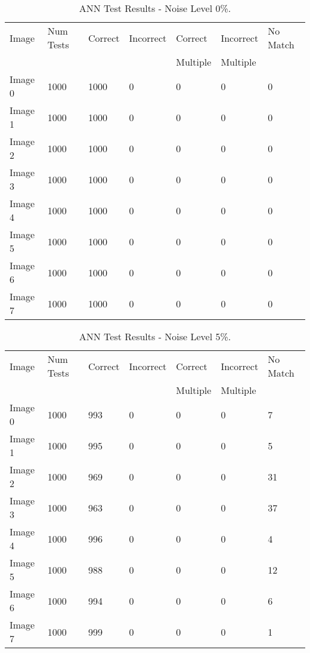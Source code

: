 
\begin{table}[tbh]
\caption{ANN Test Results - Noise Level 0\%. \label{table:ann0}}
\begin{center}
\begin{tabular}{|l|l|l|l|l|l|l|}
  \hline
  Image & Num Tests & Correct & Incorrect & Correct & Incorrect & No Match \\
  &&&&Multiple&Multiple&\\
 \hline
  Image 0 & 1000 & 1000 & 0 & 0 & 0 & 0\\
\hline
  Image 1 & 1000 & 1000 & 0 & 0 & 0 & 0 \\ 
\hline
  Image 2 & 1000 & 1000 & 0 & 0 & 0 & 0 \\
\hline
  Image 3 & 1000 & 1000 & 0 & 0 & 0 & 0\\
\hline
  Image 4 &1000 & 1000 & 0 & 0 & 0 & 0 \\
\hline
  Image 5 &1000 & 1000 & 0 & 0 & 0 & 0 \\
\hline
  Image 6 & 1000 & 1000 & 0 & 0 & 0 & 0\\
\hline
  Image 7 & 1000 & 1000 & 0 & 0 & 0 & 0\\
  \hline
\end{tabular}
\end{center}
\end{table}

\begin{table}[tbh]
\caption{ANN Test Results - Noise Level 5\%. \label{table:ann05}}
\begin{center}
\begin{tabular}{|l|l|l|l|l|l|l|}
  \hline
  Image & Num Tests & Correct & Incorrect & Correct & Incorrect & No Match \\
  &&&&Multiple&Multiple&\\
 \hline
  Image 0 & 1000 & 993 & 0 & 0 & 0 & 7\\
\hline
  Image 1 & 1000 & 995 & 0 & 0 & 0 & 5 \\ 
\hline
  Image 2 & 1000 & 969 & 0 & 0 & 0 & 31 \\
\hline
  Image 3 & 1000 & 963 & 0 & 0 & 0 & 37\\
\hline
  Image 4 &1000 & 996 & 0 & 0 & 0 & 4 \\
\hline
  Image 5 &1000 & 988 & 0 & 0 & 0 & 12 \\
\hline
  Image 6 & 1000 & 994 & 0 & 0 & 0 & 6\\
\hline
  Image 7 & 1000 & 999 & 0 & 0 & 0 & 1\\
  \hline
\end{tabular}
\end{center}
\end{table}

